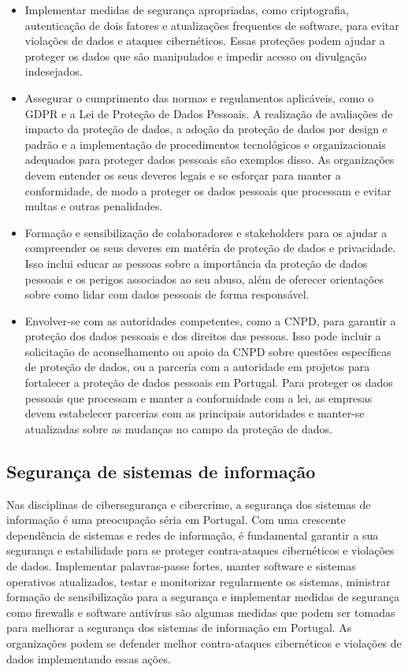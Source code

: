 \begin{itemize}
  \item Implementar medidas de segurança apropriadas, como criptografia, autenticação de dois fatores e atualizações frequentes de software, para evitar violações de dados e ataques cibernéticos. Essas proteções podem ajudar a proteger os dados que são manipulados e impedir acesso ou divulgação indesejados.
  \item Assegurar o cumprimento das normas e regulamentos aplicáveis, como o GDPR e a Lei de Proteção de Dados Pessoais. A realização de avaliações de impacto da proteção de dados, a adoção da proteção de dados por design e padrão e a implementação de procedimentos tecnológicos e organizacionais adequados para proteger dados pessoais são exemplos disso. As organizações devem entender os seus deveres legais e se esforçar para manter a conformidade, de modo a proteger os dados pessoais que processam e evitar multas e outras penalidades.
  \item Formação e sensibilização de colaboradores e stakeholders para os ajudar a compreender os seus deveres em matéria de proteção de dados e privacidade. Isso inclui educar as pessoas sobre a importância da proteção de dados pessoais e os perigos associados ao seu abuso, além de oferecer orientações sobre como lidar com dados pessoais de forma responsável.
  \item Envolver-se com as autoridades competentes, como a CNPD, para garantir a proteção dos dados pessoais e dos direitos das pessoas. Isso pode incluir a solicitação de aconselhamento ou apoio da CNPD sobre questões específicas de proteção de dados, ou a parceria com a autoridade em projetos para fortalecer a proteção de dados pessoais em Portugal. Para proteger os dados pessoais que processam e manter a conformidade com a lei, as empresas devem estabelecer parcerias com as principais autoridades e manter-se atualizadas sobre as mudanças no campo da proteção de dados.
\end{itemize}

\subsection{Segurança de sistemas de informação}

Nas disciplinas de cibersegurança e cibercrime, a segurança dos sistemas de informação é uma preocupação séria em Portugal. Com uma crescente dependência de sistemas e redes de informação, é fundamental garantir a sua segurança e estabilidade para se proteger contra-ataques cibernéticos e violações de dados. Implementar palavras-passe fortes, manter software e sistemas operativos atualizados, testar e monitorizar regularmente os sistemas, ministrar formação de sensibilização para a segurança e implementar medidas de segurança como firewalls e software antivírus são algumas medidas que podem ser tomadas para melhorar a segurança dos sistemas de informação em Portugal. As organizações podem se defender melhor contra-ataques cibernéticos e violações de dados implementando essas ações.

